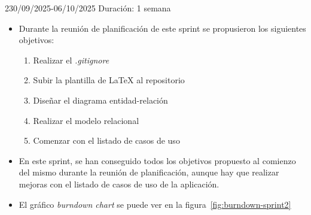 \begin{Sprint}{2}{30/09/2025-06/10/2025}
	Duración: 1 semana
	
\begin{itemize}	
	\item{}
	Durante la reunión de planificación de este sprint se propusieron los siguientes objetivos:
	\begin{enumerate}
		\item Realizar el \textit{.gitignore}
		\item Subir la plantilla de \LaTeX{} al repositorio
		\item Diseñar el diagrama entidad-relación
		\item Realizar el modelo relacional
		\item Comenzar con el listado de casos de uso
	\end{enumerate}
		
	\item{}
	En este sprint, se han conseguido todos los objetivos propuesto al comienzo del mismo durante la reunión de planificación, aunque hay que realizar mejoras con el listado de casos de uso de la aplicación.
	
	\item{}
	El gráfico \textit{burndown chart} se puede ver en la figura~\ref{fig:burndown-sprint2}
\end{itemize}


\end{Sprint}

